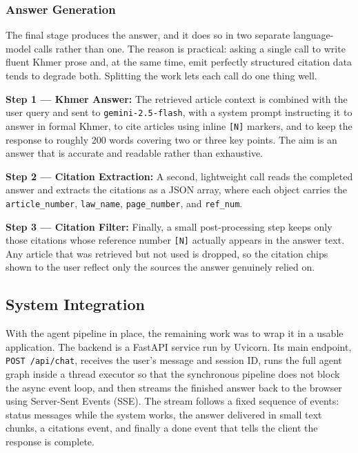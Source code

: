 \subsubsection*{Answer Generation}

\hs The final stage produces the answer, and it does so in two separate language-model
calls rather than one. The reason is practical: asking a single call to write fluent
Khmer prose and, at the same time, emit perfectly structured citation data tends to
degrade both. Splitting the work lets each call do one thing well.

\textbf{Step 1 — Khmer Answer:} The retrieved article context is combined with the user
query and sent to \texttt{gemini-2.5-flash}, with a system prompt instructing it to
answer in formal Khmer, to cite articles using inline \texttt{[N]} markers, and to keep
the response to roughly 200 words covering two or three key points. The aim is an answer
that is accurate and readable rather than exhaustive.

\textbf{Step 2 — Citation Extraction:} A second, lightweight call reads the completed
answer and extracts the citations as a JSON array, where each object carries the
\texttt{article\_number}, \texttt{law\_name}, \texttt{page\_number}, and
\texttt{ref\_num}.

\textbf{Step 3 — Citation Filter:} Finally, a small post-processing step keeps only those
citations whose reference number \texttt{[N]} actually appears in the answer text. Any
article that was retrieved but not used is dropped, so the citation chips shown to the
user reflect only the sources the answer genuinely relied on.


\subsection{System Integration}

\hs With the agent pipeline in place, the remaining work was to wrap it in a usable
application. The backend is a FastAPI service run by Uvicorn. Its main endpoint,
\texttt{POST /api/chat}, receives the user's message and session ID, runs the full agent
graph inside a thread executor so that the synchronous pipeline does not block the async
event loop, and then streams the finished answer back to the browser using Server-Sent
Events (SSE). The stream follows a fixed sequence of events: status messages while the
system works, the answer delivered in small text chunks, a citations event, and finally
a done event that tells the client the response is complete.

